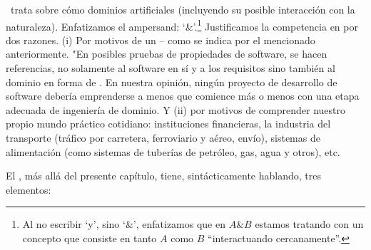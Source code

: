 \begynd
\pind  {} \manual\ trata sobre cómo  dominios artificiales
      (incluyendo su posible interacción con la naturaleza).
      \pind Enfatizamos el ampersand: `\&'.\footnote{Al no escribir `y', sino `\&', enfatizamos que en
      ${A\&B}$ estamos tratando con un  concepto que consiste en
      tanto $A$ como $B$ ``interactuando cercanamente''.}
\pind Justificamos la competencia en 
      por dos razones.
\begynd
\pind (i) Por motivos de un  -- como se indica por el  mencionado anteriormente. "En posibles pruebas de propiedades de software, se hacen referencias, no solamente al software en sí y a los requisitos sino también al dominio en forma de .
      En nuestra opinión, ningún proyecto de desarrollo de software debería
      emprenderse a menos que comience más o menos con una etapa adecuada de ingeniería
      de dominio. Y
      \pind (ii) por motivos de comprender  nuestro propio
      mundo práctico cotidiano: instituciones financieras, la industria del transporte
      (tráfico por carretera, ferroviario y aéreo, envío), sistemas de alimentación
      (como sistemas de tuberías de petróleo, gas, agua y otros), etc.
\afslut
\afslut


\label{sec:Structure}

\begynd
\pind El \manual, más allá del presente capítulo, tiene, sintácticamente
hablando, tres elementos:
\afslut

